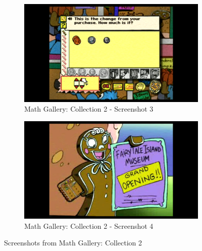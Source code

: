 \begin{figure}[H]
    \begin{subfigure}{0.45\textwidth}
        \centering
        \includegraphics[width=\linewidth]{Games/MathGalleryCollection/Images/MathGalleryCollection2Image3.png}
        \caption{Math Gallery: Collection 2 - Screenshot 3}
    \end{subfigure}
    \begin{subfigure}{0.45\textwidth}
        \centering
        \includegraphics[width=\linewidth]{Games/MathGalleryCollection/Images/MathGalleryCollection2Image4.png}
        \caption{Math Gallery: Collection 2 - Screenshot 4}
    \end{subfigure}
    \caption{Screenshots from Math Gallery: Collection 2}
\end{figure}